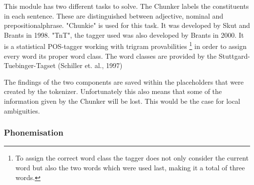 \documentclass[a4paper, 12pt]{article}
\begin{document}
This module has two different tasks to solve. 
The Chunker labels the constituents in each sentence.
These are distinguished between adjective, nominal and prepositionalphrase. "Chunkie" is used for this task. 
It was developed by Skut and Brants in 1998. 
"TnT", the tagger used was also developed by Brants in 2000. 
It is a statistical POS-tagger working with trigram provabilities \footnote {To assign the correct word class the tagger does not only consider the current word but also the two words which were used last, making it a total of three words.} in order to assign every word its proper word class.
The word classes are provided by the Stuttgard-Tuebinger-Tagset (Schiller et. al., 1997)

The findings of the two components are saved within the placeholders that were created by the tokenizer.
Unfortunately this also means that some of the information given by the Chunker will be lost. This would be the case for local ambiguities.


\subsubsection*{Phonemisation}
\end{document}
